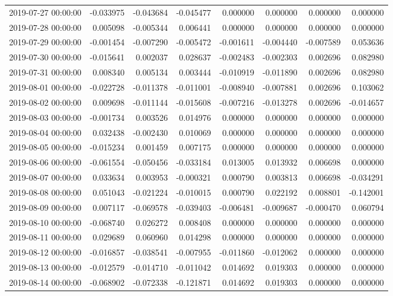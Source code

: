 \begin{tabular}{lrrrrrrr}
2019-07-27 00:00:00 & -0.033975 & -0.043684 & -0.045477 & 0.000000 & 0.000000 & 0.000000 & 0.000000 \\
2019-07-28 00:00:00 & 0.005098 & -0.005344 & 0.006441 & 0.000000 & 0.000000 & 0.000000 & 0.000000 \\
2019-07-29 00:00:00 & -0.001454 & -0.007290 & -0.005472 & -0.001611 & -0.004440 & -0.007589 & 0.053636 \\
2019-07-30 00:00:00 & -0.015641 & 0.002037 & 0.028637 & -0.002483 & -0.002303 & 0.002696 & 0.082980 \\
2019-07-31 00:00:00 & 0.008340 & 0.005134 & 0.003444 & -0.010919 & -0.011890 & 0.002696 & 0.082980 \\
2019-08-01 00:00:00 & -0.022728 & -0.011378 & -0.011001 & -0.008940 & -0.007881 & 0.002696 & 0.103062 \\
2019-08-02 00:00:00 & 0.009698 & -0.011144 & -0.015608 & -0.007216 & -0.013278 & 0.002696 & -0.014657 \\
2019-08-03 00:00:00 & -0.001734 & 0.003526 & 0.014976 & 0.000000 & 0.000000 & 0.000000 & 0.000000 \\
2019-08-04 00:00:00 & 0.032438 & -0.002430 & 0.010069 & 0.000000 & 0.000000 & 0.000000 & 0.000000 \\
2019-08-05 00:00:00 & -0.015234 & 0.001459 & 0.007175 & 0.000000 & 0.000000 & 0.000000 & 0.000000 \\
2019-08-06 00:00:00 & -0.061554 & -0.050456 & -0.033184 & 0.013005 & 0.013932 & 0.006698 & 0.000000 \\
2019-08-07 00:00:00 & 0.033634 & 0.003953 & -0.000321 & 0.000790 & 0.003813 & 0.006698 & -0.034291 \\
2019-08-08 00:00:00 & 0.051043 & -0.021224 & -0.010015 & 0.000790 & 0.022192 & 0.008801 & -0.142001 \\
2019-08-09 00:00:00 & 0.007117 & -0.069578 & -0.039403 & -0.006481 & -0.009687 & -0.000470 & 0.060794 \\
2019-08-10 00:00:00 & -0.068740 & 0.026272 & 0.008408 & 0.000000 & 0.000000 & 0.000000 & 0.000000 \\
2019-08-11 00:00:00 & 0.029689 & 0.060960 & 0.014298 & 0.000000 & 0.000000 & 0.000000 & 0.000000 \\
2019-08-12 00:00:00 & -0.016857 & -0.038541 & -0.007955 & -0.011860 & -0.012062 & 0.000000 & 0.000000 \\
2019-08-13 00:00:00 & -0.012579 & -0.014710 & -0.011042 & 0.014692 & 0.019303 & 0.000000 & 0.000000 \\
2019-08-14 00:00:00 & -0.068902 & -0.072338 & -0.121871 & 0.014692 & 0.019303 & 0.000000 & 0.000000 \\

\end{tabular}

